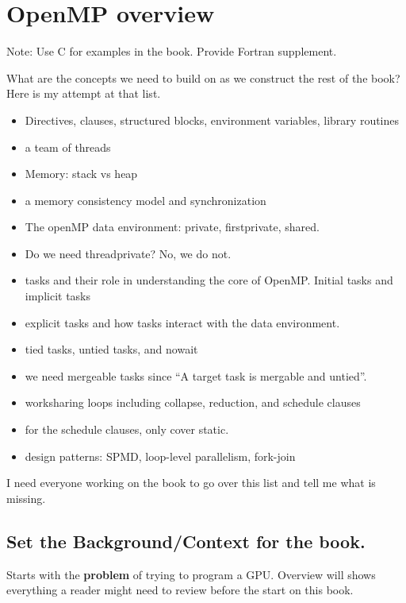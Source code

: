 
\def\ArtDir{02.Overview/figures}%

\chapter[OpenMP overview]{OpenMP overview}
\label{chapter:overview}

Note: Use C for examples in the book. Provide Fortran supplement.

What are the concepts we need to build on as we construct the rest of the book?  Here is my attempt at that list.  
\begin{itemize}
\item Directives, clauses, structured blocks, environment variables, library routines
\item a team of threads
\item Memory: stack vs heap
\item a memory consistency model and synchronization
\item The openMP data environment: private, firstprivate, shared.  
\item Do we need threadprivate?  No, we do not.
\item tasks and their role in understanding the core of OpenMP.  Initial tasks and implicit tasks
\item explicit tasks and how tasks interact with the data environment.
\item tied tasks, untied tasks, and nowait
\item we need mergeable tasks since ``A target task is mergable and untied''.
\item worksharing loops including collapse, reduction, and schedule clauses
\item for the schedule clauses, only cover static. 
\item design patterns: SPMD, loop-level parallelism, fork-join
\end{itemize}
I need everyone working on the book to go over this list and tell me what is missing.


\section{Set the Background/Context for the book.}

Starts with the {\bf problem} of trying to program a GPU.
Overview will shows everything a reader might need to review before the start on this book.

